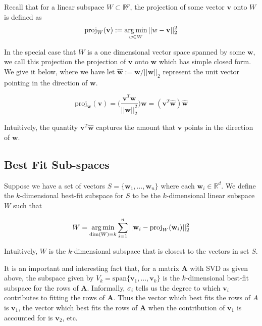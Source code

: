 Recall that for a linear subspace $W \subset \mathbb{R}^{p}$, the projection of some vector $\textbf{v}$ onto $W$ is defined as
\begin{equation}
\text{proj}_{W}(\textbf{v}) := \operatorname*{arg\,min}_{w \in W} \vert \vert w - \textbf{v}\vert \vert _{2}^2
\label{proj_def}
\end{equation}

In the special case that $W$ is a one dimensional vector space spanned by some $\textbf{w}$, we call this projection the projection of  $\textbf{v}$ onto $\textbf{w}$ which has simple closed form. We give it below, where we have let $\hat{\textbf{w}} := \textbf{w}/\vert \vert \textbf{w}\vert \vert _2$ represent the unit vector pointing in the direction of $\textbf{w}$.

\begin{equation}
\textrm{proj}_{\textbf{w}}(\textbf{v}) = \bigg(\frac{\textbf{v}^{T}\textbf{w}}{\vert \vert \textbf{w}\vert \vert _2^2}\bigg) \textbf{w} = (\textbf{v}^{T}\hat{\textbf{w}}) \hat{\textbf{w}}
\label{proj_1d}
\end{equation}

Intuitively, the quantity $\textbf{v}^{T}\hat{\textbf{w}}$ captures the amount that $\textbf{v}$ points in the direction of $\textbf{w}$.

\subsection{Best Fit Sub-spaces}

Suppose we have a set of vectors $S = \{\textbf{w}_{1}, \dots, \textbf{w}_{n}\}$ where each $\textbf{w}_{i} \in \mathbb{R}^{d}$. We define the $k$-dimensional best-fit subspace for $S$ to be the $k$-dimensional linear subspace $W$ such that

\begin{equation}
W = \operatorname*{arg\,min}_{\textrm{dim}(W) = k} \sum_{i=1}^{n} \vert \vert \textbf{w}_{i} - \textrm{proj}_{W}(\textbf{w}_i)\vert \vert _2^2
\label{best_fit}
\end{equation}

Intuitively, $W$ is the $k$-dimensional subspace that is closest to the vectors in set $S$. \newline

It is an important and interesting fact that, for a matrix $\textbf{A}$ with SVD as given above, the subspace given by $V_{k} = \textrm{span}\{\textbf{v}_{1}, \dots, \textbf{v}_{k}\}$ is the $k$-dimensional best-fit subspace for the rows of $\textbf{A}$. Informally, $\sigma_i$ tells us the degree to which $\textbf{v}_{i}$ contributes to fitting the rows of $\textbf{A}$. Thus the vector which best fits the rows of $A$ is $\textbf{v}_{1}$, the vector which best fits the rows of $\textbf{A}$ when the contribution of $\textbf{v}_1$ is accounted for is $\textbf{v}_2$, etc.


